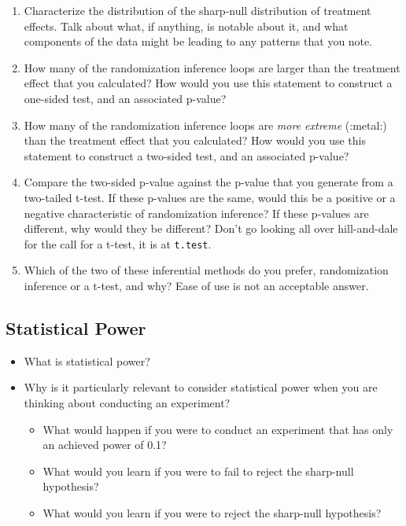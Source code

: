 \documentclass[
]{article}
\providecommand{\tightlist}{%
  \setlength{\itemsep}{0pt}\setlength{\parskip}{0pt}}
\begin{document}
\begin{enumerate}
\def\labelenumi{\arabic{enumi}.}
\item
  Characterize the distribution of the sharp-null distribution of treatment effects. Talk about what, if anything, is notable about it, and what components of the data might be leading to any patterns that you note.
\item
  How many of the randomization inference loops are larger than the treatment effect that you calculated? How would you use this statement to construct a one-sided test, and an associated p-value?
\item
  How many of the randomization inference loops are \emph{more extreme} (:metal:) than the treatment effect that you calculated? How would you use this statement to construct a two-sided test, and an associated p-value?
\item
  Compare the two-sided p-value against the p-value that you generate from a two-tailed t-test. If these p-values are the same, would this be a positive or a negative characteristic of randomization inference? If these p-values are different, why would they be different? Don't go looking all over hill-and-dale for the call for a t-test, it is at \texttt{t.test}.
\item
  Which of the two of these inferential methods do you prefer, randomization inference or a t-test, and why? Ease of use is not an acceptable answer.
\end{enumerate}

\hypertarget{statistical-power}{%
\subsection{Statistical Power}\label{statistical-power}}

\begin{itemize}
\tightlist
\item
  What is statistical power?
\item
  Why is it particularly relevant to consider statistical power when you are thinking about conducting an experiment?

  \begin{itemize}
  \tightlist
  \item
    What would happen if you were to conduct an experiment that has only an achieved power of 0.1?
  \item
    What would you learn if you were to fail to reject the sharp-null hypothesis?
  \item
    What would you learn if you were to reject the sharp-null hypothesis?
  \end{itemize}
\end{itemize}
\end{document}

